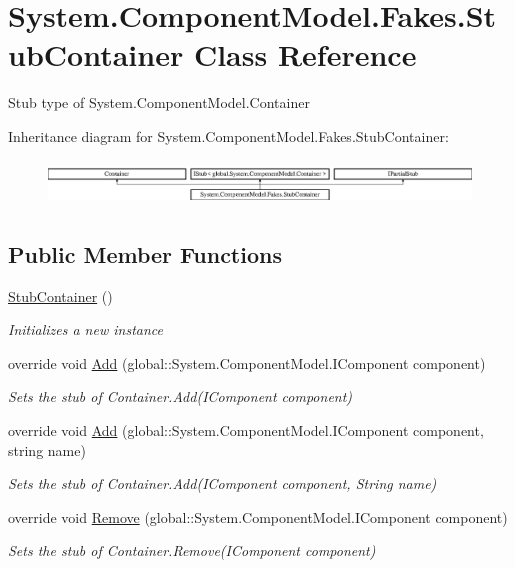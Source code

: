 \hypertarget{class_system_1_1_component_model_1_1_fakes_1_1_stub_container}{\section{System.\-Component\-Model.\-Fakes.\-Stub\-Container Class Reference}
\label{class_system_1_1_component_model_1_1_fakes_1_1_stub_container}
}


Stub type of System.\-Component\-Model.\-Container 


Inheritance diagram for System.\-Component\-Model.\-Fakes.\-Stub\-Container\-:\begin{figure}[H]
\begin{center}
\leavevmode
\includegraphics[height=1.200429cm]{class_system_1_1_component_model_1_1_fakes_1_1_stub_container}
\end{center}
\end{figure}
\subsection*{Public Member Functions}
\begin{DoxyCompactItemize}
\item 
\hyperlink{class_system_1_1_component_model_1_1_fakes_1_1_stub_container_a816a72fcf1c0f0c159d675c9e2a212a3}{Stub\-Container} ()
\begin{DoxyCompactList}\small\item\em Initializes a new instance\end{DoxyCompactList}\item 
override void \hyperlink{class_system_1_1_component_model_1_1_fakes_1_1_stub_container_a88b21e21e039991fb7dc09a2728818fb}{Add} (global\-::\-System.\-Component\-Model.\-I\-Component component)
\begin{DoxyCompactList}\small\item\em Sets the stub of Container.\-Add(\-I\-Component component)\end{DoxyCompactList}\item 
override void \hyperlink{class_system_1_1_component_model_1_1_fakes_1_1_stub_container_a92153bf4e451ac76ca58c7d6b0be3dd7}{Add} (global\-::\-System.\-Component\-Model.\-I\-Component component, string name)
\begin{DoxyCompactList}\small\item\em Sets the stub of Container.\-Add(\-I\-Component component, String name)\end{DoxyCompactList}\item 
override void \hyperlink{class_system_1_1_component_model_1_1_fakes_1_1_stub_container_ae7614913c44ba788e78ed815a33ae7ae}{Remove} (global\-::\-System.\-Component\-Model.\-I\-Component component)
\begin{DoxyCompactList}\small\item\em Sets the stub of Container.\-Remove(\-I\-Component component)\end{DoxyCompactList}\end{DoxyCompactItemize}

